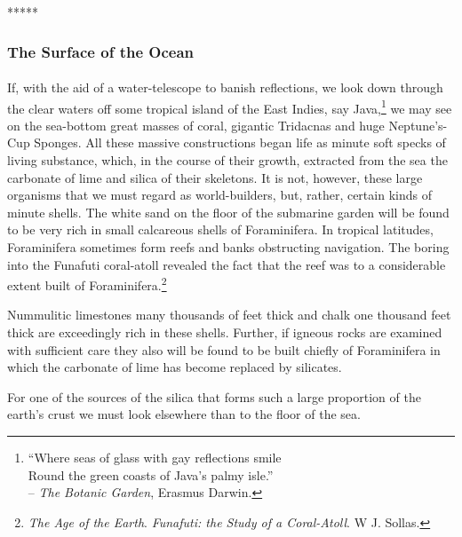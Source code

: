 \documentclass[a4paper, 12pt, oneside]{article}
\begin{document}
\centerline{*\hspace{15mm}*\hspace{15mm}*\hspace{15mm}*\hspace{15mm}*}
\bigskip

\subsubsection{The Surface of the Ocean}
\paragraph{}
If, with the aid of a water-telescope to banish reflections, we look down through the clear waters off some tropical island of the East Indies, say Java,\footnote{``Where seas of glass with gay reflections smile\\\hspace*{5mm}Round the green coasts of Java's palmy isle.''\\\hspace*{10mm}-- \emph{The Botanic Garden}, Erasmus Darwin.} we may see on the sea-bottom great masses of coral, gigantic Tridacnas and huge Neptune's-Cup Sponges. All these massive constructions began life as minute soft specks of living substance, which, in the course of their growth, extracted from the sea the carbonate of lime and silica of their skeletons. It is not, however, these large organisms that we must regard as world-builders, but, rather, certain kinds of minute shells. The white sand on the floor of the submarine garden will be found to be very rich in small calcareous shells of Foraminifera. In tropical latitudes, Foraminifera sometimes form reefs and banks obstructing navigation. The boring into the Funafuti coral-atoll revealed the fact that the reef was to a considerable extent built of Foraminifera.\footnote{\emph{The Age of the Earth}. \emph{Funafuti: the Study of a Coral-Atoll}. W J. Sollas.}

Nummulitic limestones many thousands of feet thick and chalk one thousand feet thick are exceedingly rich in these shells. Further, if igneous rocks are examined with sufficient care they also will be found to be built chiefly of Foraminifera in which the carbonate of lime has become replaced by silicates.

For one of the sources of the silica that forms such a large proportion of the earth's crust we must look elsewhere than to the floor of the sea.
\end{document}
